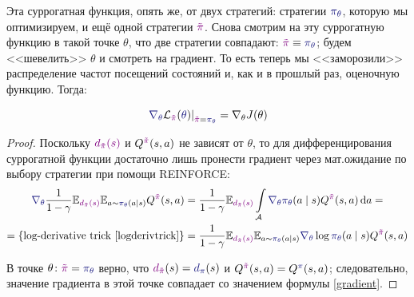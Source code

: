 Эта суррогатная функция, опять же, от двух стратегий: стратегии $\textcolor{ChadBlue}{\pi_{\theta}}$, которую мы оптимизируем, и ещё одной стратегии $\textcolor{ChadPurple}{\tilde{\pi}}$. Снова смотрим на эту суррогатную функцию в такой точке $\theta$, что две стратегии совпадают: $\textcolor{ChadPurple}{\tilde{\pi}} \HM\equiv \textcolor{ChadBlue}{\pi_{\theta}}$; будем <<шевелить>> $\theta$ и смотреть на градиент. То есть теперь мы <<заморозили>> распределение частот посещений состояний и, как и в прошлый раз, оценочную функцию. Тогда:

\begin{proposition}
$$\left. \textcolor{ChadBlue}{\nabla_{\theta}} \mathcal{L}_{\textcolor{ChadPurple}{\tilde{\pi}}}(\textcolor{ChadBlue}{\theta}) \right|_{\textcolor{ChadPurple}{\tilde{\pi}} = \textcolor{ChadBlue}{\pi_{\theta}}} = \nabla_{\theta} J(\theta)$$
\begin{proof}
Поскольку $\textcolor{ChadPurple}{d_{\tilde{\pi}}(s)}$ и $Q^{\textcolor{ChadPurple}{\tilde{\pi}}}(s, a)$ не зависят от $\theta$, то для дифференцирования суррогатной функции достаточно лишь пронести градиент через мат.ожидание по выбору стратегии при помощи REINFORCE:
\begin{align*}
\textcolor{ChadBlue}{\nabla_{\theta}} \frac{1}{1 - \gamma}\E_{\textcolor{ChadPurple}{d_{\tilde{\pi}}(s)}} \E_{a \sim \textcolor{ChadBlue}{\pi_{\theta}}(a \mid s)} Q^{\textcolor{ChadPurple}{\tilde{\pi}}}(s, a) &= 
\frac{1}{1 - \gamma}\E_{\textcolor{ChadPurple}{d_{\tilde{\pi}}(s)}} \int\limits_{\A} \textcolor{ChadBlue}{\nabla_{\theta}} \textcolor{ChadBlue}{\pi_{\theta}}(a \mid s) Q^{\textcolor{ChadPurple}{\tilde{\pi}}}(s, a) \diff a = \\
= \{ \text{log-derivative trick \eqref{logderivtrick}} \}
&= \frac{1}{1 - \gamma}\E_{\textcolor{ChadPurple}{d_{\tilde{\pi}}(s)}} \E_{a \sim \textcolor{ChadBlue}{\pi_{\theta}}(a \mid s)} \textcolor{ChadBlue}{\nabla_{\theta}} \log \textcolor{ChadBlue}{\pi_{\theta}}(a \mid s) Q^{\textcolor{ChadPurple}{\tilde{\pi}}}(s, a)
\end{align*}

В точке $\theta \colon \textcolor{ChadPurple}{\tilde{\pi}} \HM= \textcolor{ChadBlue}{\pi_{\theta}}$ верно, что $\textcolor{ChadPurple}{d_{\tilde{\pi}}}(s) \HM= \textcolor{ChadBlue}{d_{\pi}}(s)$ и $Q^{\textcolor{ChadPurple}{\tilde{\pi}}}(s, a) \HM = Q^{\textcolor{ChadBlue}{\pi}}(s, a)$; следовательно, значение градиента в этой точке совпадает со значением формулы \eqref{gradient}.
\end{proof}
\end{proposition}

